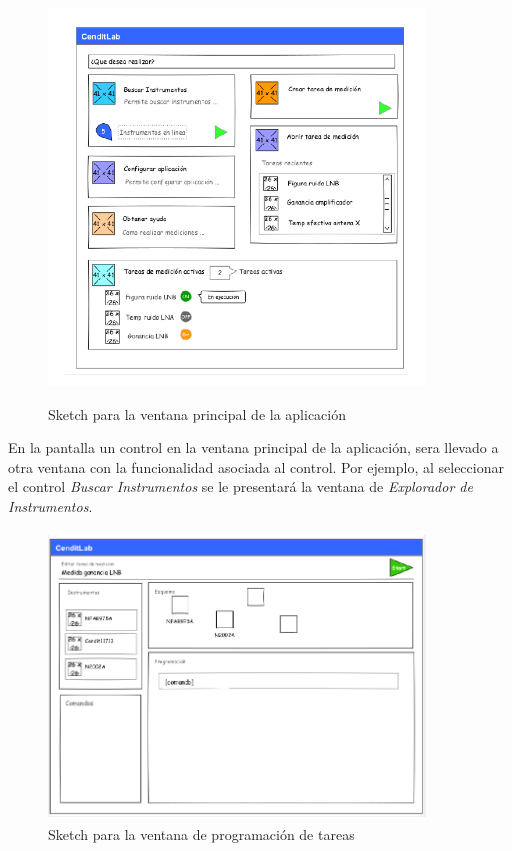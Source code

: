 \documentclass[paper=a4,oneside,fontsize=12pt]{article}
\begin{document}
	\begin{figure}[]
		\centering 
		\includegraphics[width=10cm]{Imagenes/MainWindowUI.pdf}
		\label{Fig:MainWndowUI} 
		\caption{Sketch para la ventana principal de la aplicación}
	\end{figure}		
	
	En la pantalla un control en la ventana principal de la aplicación, sera llevado a otra ventana con la funcionalidad asociada al control. Por ejemplo, al seleccionar el control \emph{Buscar Instrumentos} se le presentará la ventana de \emph{Explorador de Instrumentos}. 
	
	\begin{figure}[H]
		\centering 
		\includegraphics[width=10cm]{Imagenes/ProgramWindowUI.pdf}
		\caption{Sketch para la ventana de programación de tareas}
		\label{Fig:ProgramWindowUI} 		
	\end{figure}
	
\end{document}
